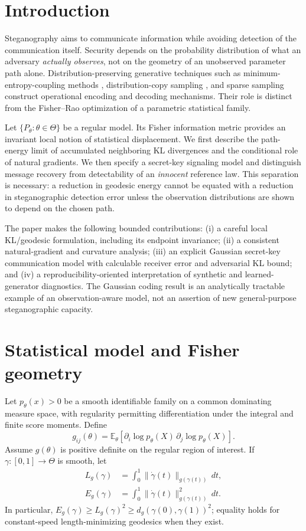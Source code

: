 \documentclass[preprint,12pt]{elsarticle}
\newcommand{\E}{\mathbb E}
\begin{document}
\section{Introduction}
Steganography aims to communicate information while avoiding
detection of the communication itself.
Security depends on the probability distribution of what an
adversary \emph{actually observes}, not on the geometry of an
unobserved parameter path alone. Distribution-preserving
generative techniques such as minimum-entropy-coupling methods
\cite{schroeder2023}, distribution-copy sampling
\cite{ding2023}, and sparse sampling \cite{wang2025}
construct operational encoding and decoding mechanisms.
Their role is distinct from the Fisher--Rao optimization of
a parametric statistical family.


Let $\{P_\theta:\theta\in\Theta\}$ be a regular model.
Its Fisher information metric provides an invariant local
notion of statistical displacement. We first describe the
path-energy limit of accumulated neighboring KL divergences
and the conditional role of natural gradients. We then
specify a secret-key signaling model and distinguish
message recovery from detectability of an \emph{innocent}
reference law. This separation is necessary: a reduction in
geodesic energy cannot be equated with a reduction in
steganographic detection error unless the observation
distributions are shown to depend on the chosen path.


The paper makes the following bounded contributions:
(i) a careful local KL/geodesic formulation, including its
endpoint invariance; (ii) a consistent natural-gradient and
curvature analysis; (iii) an explicit Gaussian secret-key
communication model with calculable receiver error and
adversarial KL bound; and (iv) a reproducibility-oriented
interpretation of synthetic and learned-generator diagnostics.
The Gaussian coding result is an analytically tractable
example of an observation-aware model, not an assertion of
new general-purpose steganographic capacity.


\section{Statistical model and Fisher geometry}
Let $p_\theta(x)>0$ be a smooth identifiable family on a
common dominating measure space, with regularity permitting
differentiation under the integral and finite score moments.
Define
\begin{equation}
 g_{ij}(\theta)=\E_\theta[
 \partial_i\log p_\theta(X)\,
 \partial_j\log p_\theta(X)].
 \label{eq:fisher}
\end{equation}
Assume $g(\theta)$ is positive definite on the regular
region of interest. If $\gamma:[0,1]\to\Theta$ is smooth,
let
\begin{align}
 L_g(\gamma)&=\int_0^1\|\dot\gamma(t)\|_{g(\gamma(t))}\,dt,\\
 E_g(\gamma)&=\int_0^1\|\dot\gamma(t)\|_{g(\gamma(t))}^{2}\,dt.
 \label{eq:energy}
\end{align}
In particular, $E_g(\gamma)\ge
L_g(\gamma)^2\ge d_g(\gamma(0),\gamma(1))^2$;
equality holds for constant-speed length-minimizing
geodesics when they exist.
\end{document}
